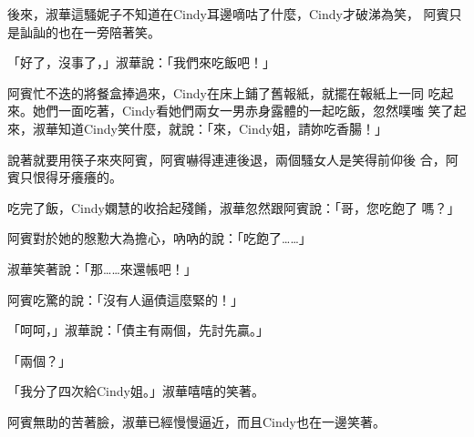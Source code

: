 後來，淑華這騷妮子不知道在Cindy耳邊嘀咕了什麼，Cindy才破涕為笑，
阿賓只是訕訕的也在一旁陪著笑。

「好了，沒事了，」淑華說：「我們來吃飯吧！」

阿賓忙不迭的將餐盒捧過來，Cindy在床上鋪了舊報紙，就擺在報紙上一同
吃起來。她們一面吃著，Cindy看她們兩女一男赤身露體的一起吃飯，忽然噗嗤
笑了起來，淑華知道Cindy笑什麼，就說：「來，Cindy姐，請妳吃香腸！」

說著就要用筷子來夾阿賓，阿賓嚇得連連後退，兩個騷女人是笑得前仰後
合，阿賓只恨得牙癢癢的。

吃完了飯，Cindy嫻慧的收拾起殘餚，淑華忽然跟阿賓說：「哥，您吃飽了
嗎？」

阿賓對於她的慇懃大為擔心，吶吶的說：「吃飽了……」

淑華笑著說：「那……來還帳吧！」

阿賓吃驚的說：「沒有人逼債這麼緊的！」

「呵呵，」淑華說：「債主有兩個，先討先贏。」

「兩個？」

「我分了四次給Cindy姐。」淑華嘻嘻的笑著。

阿賓無助的苦著臉，淑華已經慢慢逼近，而且Cindy也在一邊笑著。










